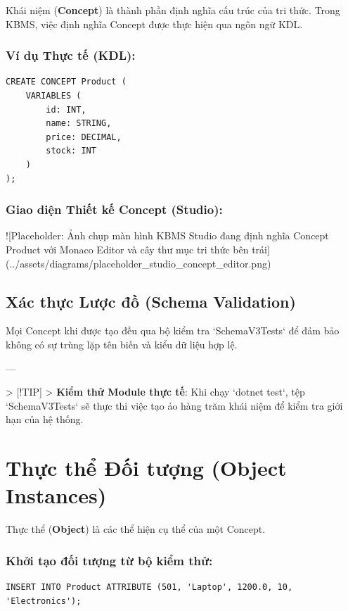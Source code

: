 Khái niệm (\textbf{Concept}) là thành phần định nghĩa cấu trúc của tri thức. Trong KBMS, việc định nghĩa Concept được thực hiện qua ngôn ngữ KDL.

\subsubsection{Ví dụ Thực tế (KDL):}
\begin{verbatim}
CREATE CONCEPT Product (
    VARIABLES (
        id: INT,
        name: STRING,
        price: DECIMAL,
        stock: INT
    )
);
\end{verbatim}

\subsubsection{Giao diện Thiết kế Concept (Studio):}

![Placeholder: Ảnh chụp màn hình KBMS Studio đang định nghĩa Concept Product với Monaco Editor và cây thư mục tri thức bên trái](../assets/diagrams/placeholder\_studio\_concept\_editor.png)

\subsection{Xác thực Lược đồ (Schema Validation)}

Mọi Concept khi được tạo đều qua bộ kiểm tra `SchemaV3Tests` để đảm bảo không có sự trùng lặp tên biến và kiểu dữ liệu hợp lệ.

---

> [!TIP]
> \textbf{Kiểm thử Module thực tế}: Khi chạy `dotnet test`, tệp `SchemaV3Tests` sẽ thực thi việc tạo ảo hàng trăm khái niệm để kiểm tra giới hạn của hệ thống.

\section{Thực thể Đối tượng (Object Instances)}

Thực thể (\textbf{Object}) là các thể hiện cụ thể của một Concept. 

\subsubsection{Khởi tạo đối tượng từ bộ kiểm thử:}
\begin{verbatim}
INSERT INTO Product ATTRIBUTE (501, 'Laptop', 1200.0, 10, 'Electronics');
\end{verbatim}

